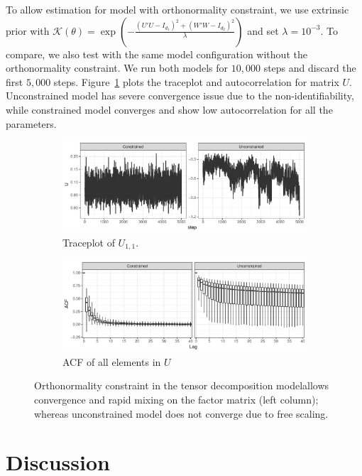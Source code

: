 \documentclass[10pt]{article}
\newcommand{\mc}[1]{\mathcal{#1}}
\DeclareMathOperator{\1}{\mathbbm{1}}
\begin{document}

To allow estimation for model with orthonormality constraint, we use extrinsic prior with $\mc K(\theta) = \exp( - \frac{(U'U-I_{d_1})^2 + (W'W-I_{d_2})^2  }{\lambda})$ and set $\lambda=10^{-3}$. To compare, we also test with the same model configuration without the orthonormality constraint. We run both models for $10,000$ steps and discard the first $5,000$ steps. Figure~\ref{tucker} plots the traceplot and autocorrelation for matrix $U$. Unconstrained model has severe convergence issue due to the non-identifiability, while constrained model converges and show low autocorrelation for all the parameters.

\begin{figure}[H]
   \begin{subfigure}[b]{1\textwidth}
    \includegraphics[width=1\textwidth]{tucker_traceplot.pdf}
    \caption{Traceplot of $U_{1,1}$.}
    \end{subfigure}
    \begin{subfigure}[b]{1\textwidth}
    \includegraphics[width=1\textwidth]{tucker_acf.pdf}
    \caption{ACF of all elements in $U$}
    \end{subfigure}
\caption{Orthonormality constraint in the tensor decomposition modelallows convergence and rapid mixing on the factor matrix (left column); whereas unconstrained model does not converge due to free scaling.}
\label{tucker}
\end{figure}

\section{Discussion}





\end{document}
